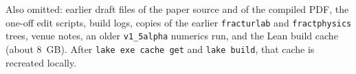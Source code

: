 \documentclass[11pt,a4paper]{article}
\begin{document}
Also omitted: earlier draft files of the paper source and of the compiled PDF,
the one-off edit scripts, build logs, copies of the earlier
\texttt{fracturlab} and \texttt{fractphysics} trees, venue notes, an older
\texttt{v1\_5alpha} numerics run, and the Lean build cache (about 8~GB). After
\texttt{lake exe cache get} and \texttt{lake build}, that cache is recreated
locally.
\end{document}

